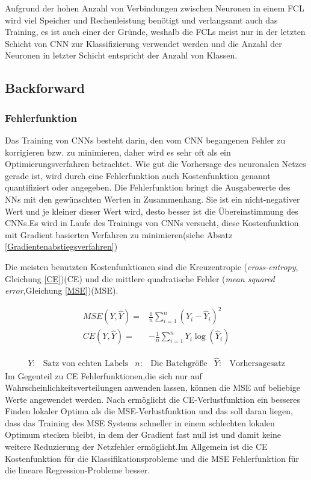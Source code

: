 \documentclass[12pt,a4paper]{scrartcl}
\numberwithin{equation}{section}
\begin{document}
Aufgrund der hohen Anzahl von Verbindungen zwischen Neuronen in einem \ac{FCL} wird viel Speicher und Rechenleistung benötigt und verlangsamt auch das Training, es ist auch einer der Gründe, weshalb die \acsp{FCL} meist nur in der letzten Schicht von \ac{CNN} zur Klassifizierung verwendet werden und die Anzahl der Neuronen in letzter Schicht entspricht der Anzahl von Klassen.









\subsection{Backforward }

\subsubsection{Fehlerfunktion}\label{Fehlerfunktion}

Das Training von \acsp{CNN} besteht darin, den vom \ac{CNN} begangenen Fehler zu korrigieren bzw. zu minimieren, daher wird es sehr oft als ein Optimierungsverfahren betrachtet.
Wie gut die Vorhersage des neuronalen Netzes gerade ist, wird durch eine Fehlerfunktion auch Kostenfunktion genannt quantifiziert oder angegeben.
Die Fehlerfunktion bringt die Ausgabewerte des \acsp{NN} mit den gewünschten Werten in Zusammenhang. Sie ist ein nicht-negativer Wert und je kleiner dieser Wert wird, desto besser ist die Übereinstimmung des \acsp{CNN}.Es wird in Laufe des Trainings von \acsp{CNN} versucht, diese Kostenfunktion mit Gradient basierten Verfahren zu minimieren(siehe Absatz \ref{Gradientenabstiegsverfahren})


Die meisten benutzten Kostenfunktionen sind die Kreuzentropie (\textit{cross-entropy}, Gleichung \ref{CE})(CE) und die mittlere quadratische Fehler (\textit{mean squared error},Gleichung \ref{MSE})(MSE). 

\begin{align}
\label{MSE}	
MSE(Y, \widehat{Y}) =&\frac{1}{n}\sum_{i = 1}^{n}(Y_i - \widehat{Y}_i)^2\\
\label{CE}
CE(Y, \widehat{Y}) =&-\frac{1}{n}\sum_{i = 1}^{n}Y_i\log(\widehat{Y}_i) 
\end{align}

\begin{align*}
Y:&\text{Satz von echten Labels} &  n: & \text{Die Batchgröße} & \widehat{Y}:&\text{Vorhersagesatz} 
\end{align*}
Im Gegenteil zu CE Fehlerfunktionen,die sich nur auf Wahrscheinlichkeitsverteilungen anwenden lassen, können die MSE auf beliebige Werte angewendet werden. Nach \cite[Pavel et al]{7} ermöglicht die CE-Verlustfunktion ein besseres Finden lokaler Optima als die MSE-Verlustfunktion und das soll daran liegen, dass das Training des MSE Systems schneller in einem schlechten lokalen Optimum stecken bleibt, in dem der Gradient fast null ist und damit keine weitere Reduzierung der Netzfehler ermöglicht.Im Allgemein ist die CE Kostenfunktion für die Klassifikationsprobleme und die MSE Fehlerfunktion für die lineare Regression-Probleme besser.
\end{document}
